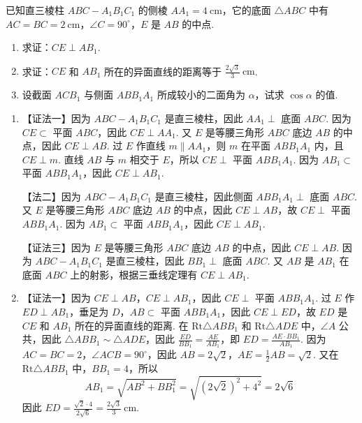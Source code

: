 \documentclass[UTF8,a4paper,oneside,11pt]{ctexbook}
\begin{document}
\begin{problem}

已知直三棱柱 \(ABC-A_{1}B_{1}C_{1}\) 的侧棱 \(AA_{1}=4\mathrm{~cm}\)，它的底面 \(\triangle ABC\) 中有 \(AC=BC=2\mathrm{~cm}\)，\(\angle C=90^{\circ}\)，\(E\) 是 \(AB\) 的中点.

\begin{enumerate}
\item 求证：\(CE\perp AB_{1}\).
\item 求证：\(CE\) 和 \(AB_{1}\) 所在的异面直线的距离等于 \(\frac{2\sqrt{3}}{3}\mathrm{~cm}\).
\item 设截面 \(ACB_{1}\) 与侧面 \(ABB_{1}A_{1}\) 所成较小的二面角为 \(\alpha\)，试求 \(\cos\alpha\) 的值.
\end{enumerate}

\begin{solution}
\begin{enumerate}
\item 【证法一】因为 \(ABC-A_{1}B_{1}C_{1}\) 是直三棱柱，因此 \(AA_{1}\perp\) 底面 \(ABC\). 因为 \(CE\subset\) 平面 \(ABC\)，因此 \(CE\perp AA_{1}\). 又 \(E\) 是等腰三角形 \(ABC\) 底边 \(AB\) 的中点，因此 \(CE\perp AB\). 过 \(E\) 作直线 \(m\parallel AA_{1}\)，则 \(m\) 在平面 \(ABB_{1}A_{1}\) 内，且 \(CE\perp m\). 直线 \(AB\) 与 \(m\) 相交于 \(E\)，所以 \(CE\perp\) 平面 \(ABB_{1}A_{1}\). 因为 \(AB_{1}\subset\) 平面 \(ABB_{1}A_{1}\)，因此 \(CE\perp AB_{1}\).

【法二】因为 \(ABC-A_{1}B_{1}C_{1}\) 是直三棱柱，因此侧面 \(ABB_{1}A_{1}\perp\) 底面 \(ABC\). 又 \(E\) 是等腰三角形 \(ABC\) 底边 \(AB\) 的中点，因此 \(CE\perp AB\)，故 \(CE\perp\) 平面 \(ABB_{1}A_{1}\). 因为 \(AB_{1}\subset\) 平面 \(ABB_{1}A_{1}\)，因此 \(CE\perp AB_{1}\).

【证法三】因为 \(E\) 是等腰三角形 \(ABC\) 底边 \(AB\) 的中点，因此 \(CE\perp AB\). 因为 \(ABC-A_{1}B_{1}C_{1}\) 是直三棱柱，因此 \(BB_{1}\perp\) 底面 \(ABC\). 又 \(AB\) 是 \(AB_{1}\) 在底面 \(ABC\) 上的射影，根据三垂线定理有 \(CE\perp AB_{1}\).

\item 【证法一】因为 \(CE\perp AB\)，\(CE\perp AB_{1}\)，因此 \(CE\perp\) 平面 \(ABB_{1}A_{1}\). 过 \(E\) 作 \(ED\perp AB_{1}\)，垂足为 \(D\)，\(AB\subset\) 平面 \(ABB_{1}A_{1}\)，因此 \(CE\perp ED\)，故 \(ED\) 是 \(CE\) 和 \(AB_{1}\) 所在的异面直线的距离. 在 \(\mathrm{Rt}\triangle ABB_{1}\) 和 \(\mathrm{Rt}\triangle ADE\) 中，\(\angle A\) 公共，因此 \(\triangle ABB_{1}\sim \triangle ADE\)，因此 \(\frac{ED}{BB_{1}}=\frac{AE}{AB_{1}}\)，即 \(ED=\frac{AE\cdot BB_{1}}{AB_{1}}\). 因为 \(AC=BC=2\)，\(\angle ACB=90^{\circ}\)，因此 \(AB=2\sqrt{2}\)，\(AE=\frac{1}{2}AB=\sqrt{2}\). 又在 \(\mathrm{Rt}\triangle ABB_{1}\) 中，\(BB_{1}=4\)，所以
\[
AB_{1}=\sqrt{AB^{2}+BB_{1}^{2}}=\sqrt{(2\sqrt{2})^{2}+4^{2}}=2\sqrt{6}
\]
因此
\(ED=\frac{\sqrt{2}\cdot4}{2\sqrt{6}}=\frac{2\sqrt{3}}{3}\mathrm{~cm}\).


\end{enumerate}
\end{solution}
\end{problem}
\end{document}
